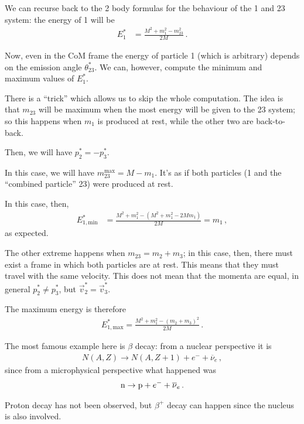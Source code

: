 \documentclass[main.tex]{subfiles}
\begin{document}
We can recurse back to the 2 body formulas for the behaviour of the 1 and 23 system: the energy of 1 will be 
%
\begin{align}
E_1^{*} &= \frac{M^2 + m_1^2 - m_{23}^2}{2M}
\,.
\end{align}

Now, even in the CoM frame the energy of particle 1 (which is arbitrary) depends on the emission angle \(\theta^{*}_{23}\). 
We can, however, compute the minimum and maximum values of \(E_1^{*}\).

There is a ``trick'' which allows us to skip the whole computation. 
The idea is that \(m_{23} \) will be maximum when the most energy will be given to the 23 system; so this happens when \(m_1 \) is produced at rest, while the other two are back-to-back. 

Then, we will have \(p^{*}_2 = -p^{*}_3\). 

In this case, we will have \(m_{23}^{\text{max}} = M - m_1 \). It's as if both particles (1 and the ``combined particle'' 23) were produced at rest. 

In this case, then, 
%
\begin{align}
E^{*}_{1, \text{min}} &= \frac{M^2 + m_1^2 - (M^2 + m_1^2 - 2 M m_1 )}{2M} = m_1
\,,
\end{align}
%
as expected. 

The other extreme happens when \(m_{23} = m_2 + m_3 \); in this case, then, there must exist a frame in which both particles are at rest. 
This means that they must travel with the same velocity. 
This does not mean that the momenta are equal, in general \(p^{*}_2 \neq p^{*}_3\), but \(\vec{v}^{*}_2 = \vec{v}^{*}_3\).

The maximum energy is therefore 
%
\begin{align}
E^{*}_{1, \text{max}} = \frac{M^2 + m_1^2 - (m_2 + m_3 )^2}{2 M }
\,.
\end{align}

The most famous example here is \(\beta \) decay: from a nuclear perspective it is 
%
\begin{align}
N(A, Z) \to N(A, Z+1) + e^{-} + \overline{\nu}_e
\,,
\end{align}
%
since from a microphysical perspective what happened was
%
\begin{align}
\ce{n} \to \ce{p} + e^{-} + \overline{\nu}_{e}
\,.
\end{align}

Proton decay has not been observed, but \(\beta^{+}\) decay can happen since the nucleus is also involved. 
\end{document}
